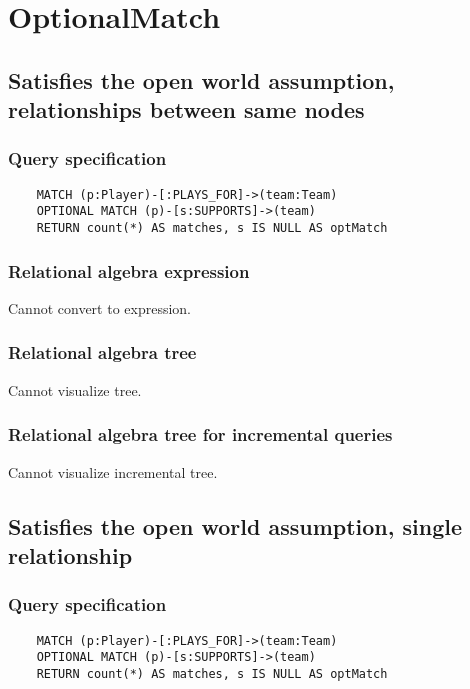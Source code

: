 	\section{OptionalMatch}

	\subsection{Satisfies the open world assumption, relationships between same nodes}

	\subsubsection*{Query specification}

	\begin{lstlisting}
	MATCH (p:Player)-[:PLAYS_FOR]->(team:Team)
	OPTIONAL MATCH (p)-[s:SUPPORTS]->(team)
	RETURN count(*) AS matches, s IS NULL AS optMatch
	\end{lstlisting}


	\subsubsection*{Relational algebra expression}

	Cannot convert to expression.

	\subsubsection*{Relational algebra tree}

	Cannot visualize tree.

	\subsubsection*{Relational algebra tree for incremental queries}

	Cannot visualize incremental tree.
	\subsection{Satisfies the open world assumption, single relationship}

	\subsubsection*{Query specification}

	\begin{lstlisting}
	MATCH (p:Player)-[:PLAYS_FOR]->(team:Team)
	OPTIONAL MATCH (p)-[s:SUPPORTS]->(team)
	RETURN count(*) AS matches, s IS NULL AS optMatch
	\end{lstlisting}


